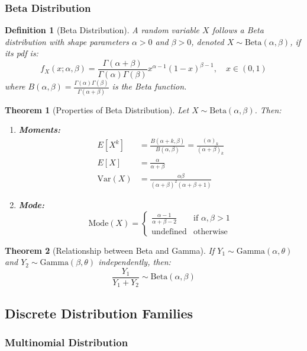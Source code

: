 \documentclass[12pt,a4paper]{article}
\newtheorem{theorem}{Theorem}[section]
\newtheorem{definition}{Definition}[section]
\theoremstyle{remark}
\begin{document}
\subsubsection{Beta Distribution}

\begin{definition}[Beta Distribution]
A random variable $X$ follows a Beta distribution with shape parameters $\alpha > 0$ and $\beta > 0$, denoted $X \sim \text{Beta}(\alpha, \beta)$, if its pdf is:
$$f_X(x; \alpha, \beta) = \frac{\Gamma(\alpha + \beta)}{\Gamma(\alpha)\Gamma(\beta)} x^{\alpha-1} (1-x)^{\beta-1}, \quad x \in (0,1)$$
where $B(\alpha, \beta) = \frac{\Gamma(\alpha)\Gamma(\beta)}{\Gamma(\alpha + \beta)}$ is the Beta function.
\end{definition}

\begin{theorem}[Properties of Beta Distribution]
Let $X \sim \text{Beta}(\alpha, \beta)$. Then:
\begin{enumerate}
\item \textbf{Moments:}
   \begin{align}
   E[X^k] &= \frac{B(\alpha + k, \beta)}{B(\alpha, \beta)} = \frac{(\alpha)_k}{(\alpha + \beta)_k}\\
   E[X] &= \frac{\alpha}{\alpha + \beta}\\
   \text{Var}(X) &= \frac{\alpha\beta}{(\alpha + \beta)^2(\alpha + \beta + 1)}
   \end{align}
\item \textbf{Mode:} 
   $$\text{Mode}(X) = \begin{cases}
   \frac{\alpha - 1}{\alpha + \beta - 2} & \text{if } \alpha, \beta > 1\\
   \text{undefined} & \text{otherwise}
   \end{cases}$$
\end{enumerate}
\end{theorem}

\begin{theorem}[Relationship between Beta and Gamma]
If $Y_1 \sim \text{Gamma}(\alpha, \theta)$ and $Y_2 \sim \text{Gamma}(\beta, \theta)$ independently, then:
$$\frac{Y_1}{Y_1 + Y_2} \sim \text{Beta}(\alpha, \beta)$$
\end{theorem}

\subsection{Discrete Distribution Families}

\subsubsection{Multinomial Distribution}
\end{document}
